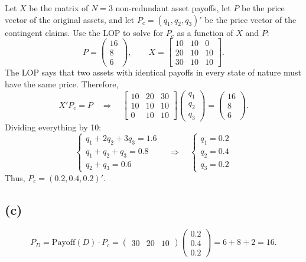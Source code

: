 \documentclass[11pt]{article}
\begin{document}
Let $X$ be the matrix of $N = 3$ non-redundant asset payoffs, let $P$ be the price vector of the original assets, and let $P_c = (q_1, q_2, q_3)'$ be the price vector of the contingent claims. Use the LOP to solve for $P_c$ as a function of $X$ and $P$:
\[
P = \begin{pmatrix} 16 \\ 8 \\ 6 \end{pmatrix}, \qquad
X = \begin{bmatrix} 10 & 10 & 0 \\ 20 & 10 & 10 \\ 30 & 10 & 10 \end{bmatrix}.
\]
The LOP says that two assets with identical payoffs in every state of nature must have the same price. Therefore,
\[
X' P_c = P \quad\Longrightarrow\quad
\begin{bmatrix} 10 & 20 & 30 \\ 10 & 10 & 10 \\ 0 & 10 & 10 \end{bmatrix}
\begin{pmatrix} q_1 \\ q_2 \\ q_3 \end{pmatrix}
= \begin{pmatrix} 16 \\ 8 \\ 6 \end{pmatrix}.
\]
Dividing everything by 10:
\[
\begin{cases}
q_1 + 2q_2 + 3q_3 = 1.6 \\
q_1 + q_2 + q_3 = 0.8 \\
q_2 + q_3 = 0.6
\end{cases}
\quad\Longrightarrow\quad
\begin{cases}
q_1 = 0.2 \\
q_2 = 0.4 \\
q_3 = 0.2
\end{cases}
\]
Thus, $P_c = (0.2, 0.4, 0.2)'$.

\subsection*{(c)}

\[
P_D = \text{Payoff}(D) \cdot P_c
= \begin{pmatrix} 30 & 20 & 10 \end{pmatrix}
\begin{pmatrix} 0.2 \\ 0.4 \\ 0.2 \end{pmatrix}
= 6 + 8 + 2 = 16.
\]
\end{document}
